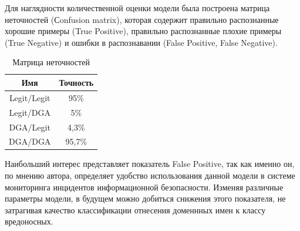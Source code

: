    Для наглядности количественной оценки модели была построена матрица неточностей (Сonfusion matrix), которая содержит правильно распознанные хорошие примеры (True Positive), правильно распознанные плохие примеры (True Negative) и ошибки в распознавании (False Positive, False Negative).
    \begin{table}[ht]
    \centering
    \caption{Матрица неточностей}\label{}
    \begin{tabular}{@{}cc@{}}
    \toprule
    Имя         & Точность \\ \midrule
    Legit/Legit & 95\%     \\
    Legit/DGA   & 5\%      \\
    DGA/Legit   & 4,3\%    \\
    DGA/DGA     & 95,7\%   \\ \bottomrule
    \end{tabular}
    \end{table}

    Наибольший интерес представляет показатель False Positive, так как именно он, по мнению автора, определяет удобство использования данной модели в системе мониторинга инцидентов информационной безопасности. Изменяя различные параметры модели, в будущем можно добиться снижения этого показателя, не затрагивая качество классификации отнесения доменнных имен к классу вредоносных.
